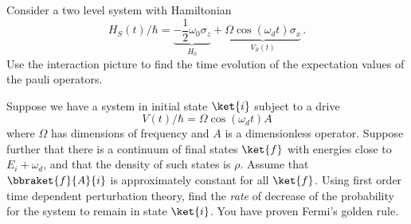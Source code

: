 

Consider a two level system with Hamiltonian
\begin{equation}
  H_S(t) / \hbar = \underbrace{-\frac{1}{2} \omega_0 \sigma_z}_{H_0} + \underbrace{\Omega \cos(\omega_d t) \sigma_x}_{V_S(t)}
  \, .
\end{equation}
Use the interaction picture to find the time evolution of the expectation values of the pauli operators.


Suppose we have a system in initial state $\ket{i}$ subject to a drive
\begin{equation} V(t)/\hbar = \Omega \cos(\omega_d t) A \end{equation}
where $\Omega$ has dimensions of frequency and $A$ is a dimensionless operator.
Suppose further that there is a continuum of final states $\ket{f}$ with energies close to $E_i + \omega_d$, and that the density of such states is $\rho$.
Assume that $\bbraket{f}{A}{i}$ is approximately constant for all $\ket{f}$.
Using first order time dependent perturbation theory, find the \emph{rate} of decrease of the probability for the system to remain in state $\ket{i}$.
You have proven Fermi's golden rule.
